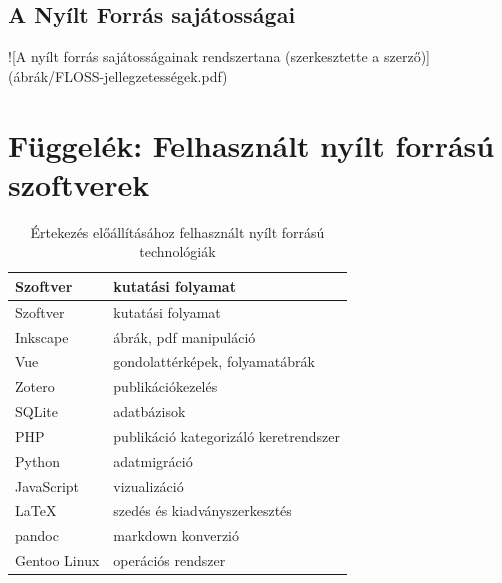 \documentclass[12pt,magyar,a4paper,oneside]{scrreprt}
\begin{document}
\newpage

\hypertarget{a-nyuxedlt-forruxe1s-sajuxe1tossuxe1gai}{%
\section{A Nyílt Forrás
sajátosságai}\label{a-nyuxedlt-forruxe1s-sajuxe1tossuxe1gai}}

\begin{landscape}
![A nyílt forrás sajátosságainak rendszertana (szerkesztette a szerző)](ábrák/FLOSS-jellegzetességek.pdf)
\end{landscape}

\hypertarget{fuxfcggeluxe9k-felhasznuxe1lt-nyuxedlt-forruxe1suxfa-szoftverek}{%
\chapter{Függelék: Felhasznált nyílt forrású
szoftverek}\label{fuxfcggeluxe9k-felhasznuxe1lt-nyuxedlt-forruxe1suxfa-szoftverek}}

\hypertarget{tbl:MyFLOSSTech}{}
\begin{longtable}[]{@{}ll@{}}
\caption{\label{tbl:MyFLOSSTech}Értekezés előállításához felhasznált
nyílt forrású technológiák}\tabularnewline
\toprule
Szoftver & kutatási folyamat\tabularnewline
\midrule
\endfirsthead
\toprule
Szoftver & kutatási folyamat\tabularnewline
\midrule
\endhead
Inkscape & ábrák, pdf manipuláció\tabularnewline
Vue & gondolattérképek, folyamatábrák\tabularnewline
Zotero & publikációkezelés\tabularnewline
SQLite & adatbázisok\tabularnewline
PHP & publikáció kategorizáló keretrendszer\tabularnewline
Python & adatmigráció\tabularnewline
JavaScript & vizualizáció\tabularnewline
\LaTeX & szedés és kiadványszerkesztés\tabularnewline
pandoc & markdown konverzió\tabularnewline
Gentoo Linux & operációs rendszer\tabularnewline
\bottomrule
\end{longtable}

\newpage
\thispagestyle{empty}
\end{document}
